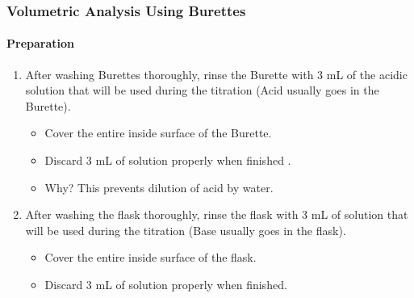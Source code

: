 \subsubsection{Volumetric Analysis Using Burettes}

\paragraph{Preparation}

\begin{enumerate}
\item After washing Burettes thoroughly, rinse the Burette with 3 mL of the acidic solution that will
be used during the titration (Acid usually goes in the Burette).
	\begin{itemize}[topsep=0ex,itemsep=0ex,partopsep=1ex,parsep=1ex]
	\item Cover the entire inside surface of the Burette.
	\item Discard 3 mL of solution properly when finished  .
	\item Why? This prevents dilution of acid by water.
	\end{itemize}
\item After washing the flask thoroughly, rinse the flask with 3 mL of solution that will
be used during the titration (Base usually goes in the flask).
	\begin{itemize}[topsep=0ex,itemsep=0ex,partopsep=1ex,parsep=1ex]
	\item Cover the entire inside surface of the flask.
	\item Discard 3 mL of solution properly when finished.
	\end{itemize}	
\end{enumerate}

